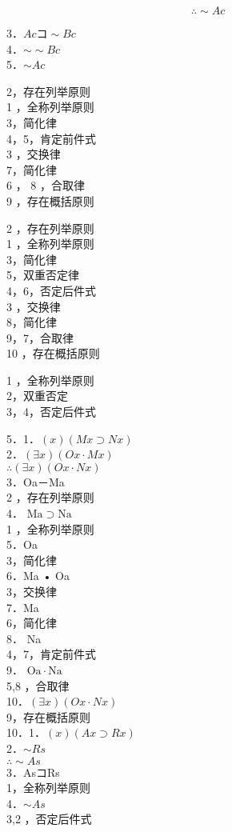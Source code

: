 $$
\therefore \sim A c
$$

3．$A c コ \sim B c$\\
4．$\sim \sim B c$\\
5．$\sim A c$

2，存在列举原则\\
1 ，全称列举原则\\
3，简化律\\
4，5，肯定前件式\\
3 ，交换律\\
7，简化律\\
6 ， 8 ，合取律\\
9 ，存在概括原则

2 ，存在列举原则\\
1 ，全称列举原则\\
3，简化律\\
5，双重否定律\\
4，6，否定后件式\\
3 ，交换律\\
8，简化律\\
9，7，合取律\\
10 ，存在概括原则

1 ，全称列举原则\\
2，双重否定\\
3，4，否定后件式

5．1．$(x)(M x \supset N x)$\\
2．$(\exists x)(O x \cdot M x)$\\
$\therefore(\exists x)(O x \cdot N x)$\\
3．Oa－Ma\\
2 ，存在列举原则\\
4． $\mathrm{Ma} \supset \mathrm{Na}$\\
1 ，全称列举原则\\
5．Oa\\
3，简化律\\
6．Ma • Oa\\
3，交换律\\
7．Ma\\
6，简化律\\
8． Na\\
4，7，肯定前件式\\
9． $\mathrm{Oa} \cdot \mathrm{Na}$\\
5,8 ，合取律\\
10．$(\exists x)(O x \cdot N x)$\\
9，存在概括原则\\
10．1．$(x)(A x \supset R x)$\\
2．$\sim R s$\\
$\therefore \sim A s$\\
3．AsコRs\\
1，全称列举原则\\
4．$\sim A s$\\
3,2 ，否定后件式

